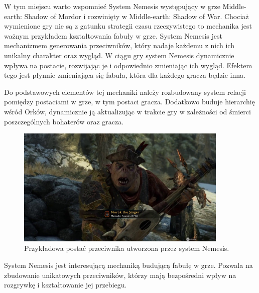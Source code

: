 W tym miejscu warto wspomnieć System Nemesis występujący w grze Middle-earth: Shadow of Mordor i rozwinięty w
Middle-earth: Shadow of War. Chociaż wymienione gry nie są z gatunku strategii czasu rzeczywistego to mechanika jest
ważnym przykładem kształtowania fabuły w grze. System Nemesis jest mechanizmem generowania przeciwników, który nadaje
każdemu z nich ich unikalny charakter oraz wygląd. W ciągu gry system Nemesis dynamicznie wpływa na postacie, rozwijając
je i odpowiednio zmieniając ich wygląd. Efektem tego jest płynnie zmieniająca się fabuła, która dla każdego gracza
będzie inna.

Do podstawowych elementów tej mechaniki należy rozbudowany system relacji pomiędzy postaciami w grze, w tym postaci
gracza. Dodatkowo buduje hierarchię wśród Orków, dynamicznie ją aktualizując w trakcie gry w zależności od śmierci
poszczególnych bohaterów oraz gracza.

\begin{figure}[h!]
    \centering
    \includegraphics[width=0.9\textwidth]{images/system_nemesis.png}
    \caption{Przykładowa postać przeciwnika utworzona przez system Nemesis.}
\end{figure}

System Nemesis jest interesującą mechaniką budującą fabułę w grze. Pozwala na zbudowanie unikatowych przeciwników,
którzy mają bezpośredni wpływ na rozgrywkę i kształtowanie jej przebiegu.